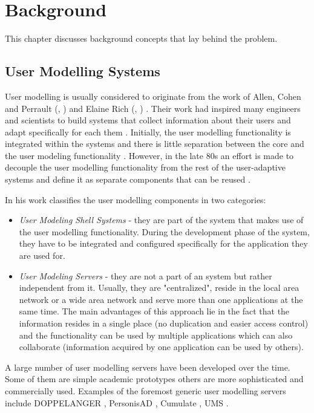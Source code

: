 
\chapter{\label{cha:background}Background}
This chapter discusses background concepts that lay behind the problem.

\section{User Modelling Systems}

User modelling is usually considered to originate from the work of Allen, Cohen and Perrault (\cite{Allen}, \cite{Cohen}) and Elaine Rich (\cite{Rich1}, \cite{Rich2}) \cite{Kobsa}. Their work had inspired many engineers and scientists to build systems that collect information about their users and adapt specifically for each them \cite{Kobsa89}. Initially, the user modelling functionality is integrated within the systems and there is little separation between the core and the user modeling functionality \cite{Kobsa}. However, in the late 80s an effort is made to decouple the user modelling functionality from the rest of the user-adaptive systems and define it as separate components that can be reused \cite{Kobsa}. 

In his work \cite{Kobsa} classifies the user modelling components in two categories:
\begin{itemize}
	\item \textit{User Modeling Shell Systems} - they are part of the system that makes use of the user modelling functionality. During the development phase of the system, they have to be integrated and configured specifically for the application they are used for.
	\item \textit{User Modeling Servers} - they are not a part of an system but rather independent from it. Usually, they are "centralized", reside in the local area network or a wide area network and serve more than one applications at the same time. The main advantages of this approach lie in the fact that the information resides in a single place (no duplication and easier access control) and the functionality can be used by multiple applications which can also collaborate (information acquired by one application can be used by others).
\end{itemize}

A large number of user modelling servers have been developed over the time. Some of them are simple academic prototypes others are more sophisticated and commercially used. Examples of the foremost generic user modelling servers include DOPPELANGER \cite{Orwant95}, PersonisAD \cite{Assad07}, Cumulate \cite{Brusilovsky04}, UMS \cite{Kobsa06}.

